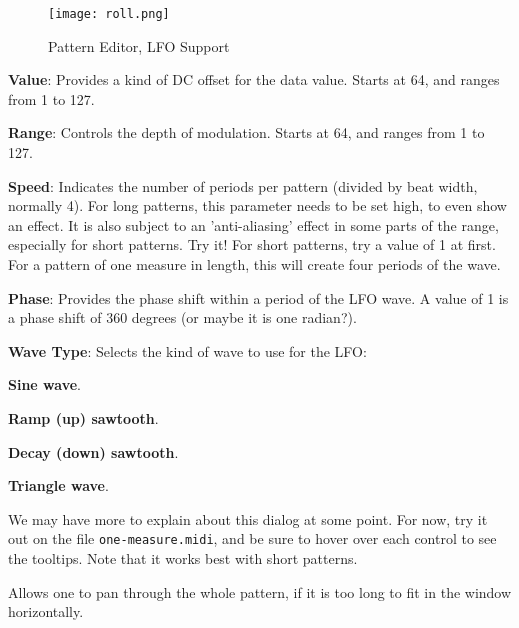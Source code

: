 \begin{figure}[H]
   \centering 
   \texttt{[image: roll.png]}
   \caption{Pattern Editor, LFO Support}
   \label{fig:pattern_editor_bottom_lfo_support}
\end{figure}


   \begin{enumber}
      \item \textbf{Value}:
         Provides a kind of DC offset for the data value. Starts at 64, and
         ranges from 1 to 127.
      \item \textbf{Range}:
         Controls the depth of modulation. Starts at 64, and ranges from 1 to
         127.
      \item \textbf{Speed}:
         Indicates the number of periods per pattern (divided by beat width,
         normally 4).  For long patterns, this parameter needs to be set high,
         to even show an effect.  It is also subject to an 'anti-aliasing'
         effect in some parts of the range, especially for short patterns.
         Try it!  For short patterns, try a value of 1 at first.  For a pattern
         of one measure in length, this will create four periods of the wave.
      \item \textbf{Phase}:
         Provides the phase shift within a period of the LFO wave.
         A value of 1 is a phase shift of 360 degrees (or maybe it is one
         radian?).
      \item \textbf{Wave Type}:
         Selects the kind of wave to use for the LFO:
         \begin{enumber}
            \item \textbf{Sine wave}.
            \item \textbf{Ramp (up) sawtooth}.
            \item \textbf{Decay (down) sawtooth}.
            \item \textbf{Triangle wave}.
         \end{enumber}
   \end{enumber}

   We may have more to explain about this dialog at some point.  For now,
   try it out on the file \texttt{one-measure.midi}, and be sure to hover over
   each control to see the tooltips.
   Note that it works best with short patterns.

   Allows one to pan through the whole pattern, if it is too long to fit in
   the window horizontally.

